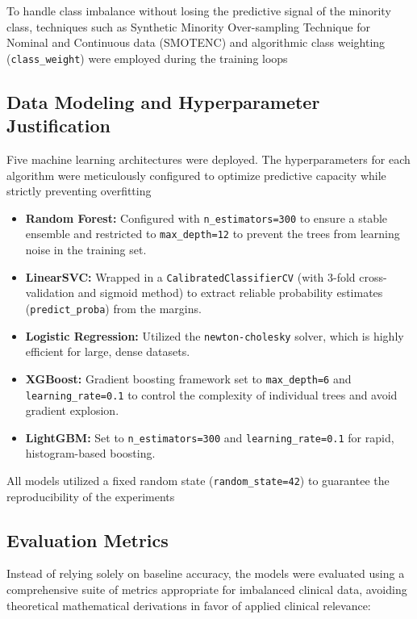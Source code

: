 \documentclass[conference]{IEEEtran}
\begin{document}
To handle class imbalance without losing the predictive signal of the minority class, techniques such as Synthetic Minority Over-sampling Technique for Nominal and Continuous data (SMOTENC) and algorithmic class weighting (\texttt{class\_weight}) were employed during the training loops %

\subsection{Data Modeling and Hyperparameter Justification}
Five machine learning architectures were deployed. The hyperparameters for each algorithm were meticulously configured to optimize predictive capacity while strictly preventing overfitting %

\begin{itemize}
    \item \textbf{Random Forest:} Configured with \texttt{n\_estimators=300} to ensure a stable ensemble and restricted to \texttt{max\_depth=12} to prevent the trees from learning noise in the training set. %
    \item \textbf{LinearSVC:} Wrapped in a \texttt{CalibratedClassifierCV} (with 3-fold cross-validation and sigmoid method) to extract reliable probability estimates (\texttt{predict\_proba}) from the margins. %
    \item \textbf{Logistic Regression:} Utilized the \texttt{newton-cholesky} solver, which is highly efficient for large, dense datasets. %
    \item \textbf{XGBoost:} Gradient boosting framework set to \texttt{max\_depth=6} and \texttt{learning\_rate=0.1} to control the complexity of individual trees and avoid gradient explosion. %
    \item \textbf{LightGBM:} Set to \texttt{n\_estimators=300} and \texttt{learning\_rate=0.1} for rapid, histogram-based boosting. %
\end{itemize}

All models utilized a fixed random state (\texttt{random\_state=42}) to guarantee the reproducibility of the experiments %

\subsection{Evaluation Metrics}
Instead of relying solely on baseline accuracy, the models were evaluated using a comprehensive suite of metrics appropriate for imbalanced clinical data, avoiding theoretical mathematical derivations in favor of applied clinical relevance:
\end{document}
